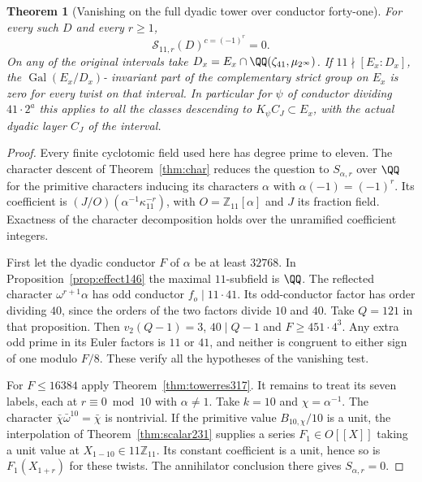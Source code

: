\documentclass[a4paper,11pt]{article}
\newtheorem{theorem}[proposition]{Theorem}
\theoremstyle{definition}
\theoremstyle{remark}
\newcommand{\ZZ}{\mathbb Z}\newcommand{\ord}{\operatorname{ord}}
\numberwithin{equation}{section}
\begin{document}
\begin{theorem}[Vanishing on the full dyadic tower over conductor forty-one]\leavevmode
\label{thm:all41tower317}
For every such \(D\) and every \(r\ge1\),
\[
                  \mathcal S_{11,r}(D)^{c=(-1)^r}=0 .
\]
On any of the original intervals take
\(D_x=E_x\cap\QQ(\zeta_{41},\mu_{2^\infty})\).
If \(11\nmid[E_x:D_x]\), the \(\operatorname{Gal}(E_x/D_x)\)-
invariant part of the complementary strict group on \(E_x\)
is zero for every twist on that interval. In particular for
\(\psi\) of conductor dividing \(41\cdot2^a\) this applies to
all the classes descending to \(K_\psi C_J\subset E_x\), with
the actual dyadic layer \(C_J\) of the interval.
\end{theorem}
\begin{proof}
Every finite cyclotomic field used here has degree prime to
eleven. The character descent of Theorem~\ref{thm:char}
reduces the question to \(S_{\alpha,r}\) over \(\QQ\) for the
primitive characters inducing its characters \(\alpha\) with
\(\alpha(-1)=(-1)^r\). Its coefficient is
\((J/O)(\alpha^{-1}\kappa_{11}^{-r})\), with \(O=\ZZ_{11}[\alpha]\)
and \(J\) its fraction field. Exactness of the character
decomposition holds over the unramified coefficient integers.

First let the dyadic conductor \(F\) of \(\alpha\) be at least
\(32768\). In Proposition~\ref{prop:effect146} the maximal
\(11\)-subfield is \(\QQ\). The reflected character
\(\omega^{r+1}\alpha\) has odd conductor \(f_o\mid 11\cdot41\).
Its odd-conductor factor has order dividing \(40\), since
the orders of the two factors divide \(10\) and \(40\).
Take \(Q=121\) in that proposition. Then \(v_2(Q-1)=3\),
\(40\mid Q-1\) and \(F\ge451\cdot 4^3\). Any extra odd prime
in its Euler factors is \(11\) or \(41\), and neither is
congruent to either sign of one modulo \(F/8\). These verify
all the hypotheses of the vanishing test.

For \(F\le16384\) apply Theorem~\ref{thm:towerres317}.
It remains to treat its seven labels, each at \(r\equiv0\bmod10\)
with \(\alpha\ne1\). Take \(k=10\) and \(\chi=\alpha^{-1}\).
The character \(\bar\chi\bar\omega^{10}=\bar\chi\) is nontrivial.
If the primitive value \(B_{10,\chi}/10\) is a unit, the
interpolation of Theorem~\ref{thm:scalar231} supplies a series
\(F_1\in O[[X]]\) taking a unit value at
\(X_{1-10}\in11\ZZ_{11}\). Its constant coefficient is a
unit, hence so is \(F_1(X_{1+r})\) for these twists. The
annihilator conclusion there gives \(S_{\alpha,r}=0\).


\end{proof}
\end{document}
